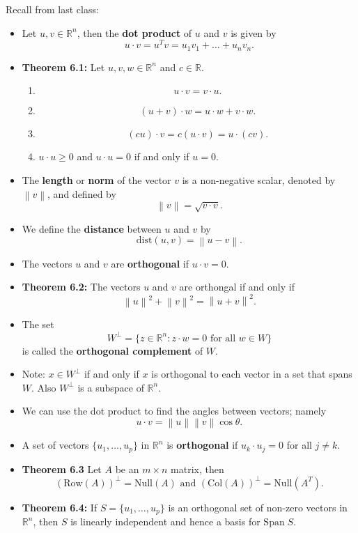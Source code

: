 \documentclass[12pt,letterpaper]{article}
\newcommand{\norm}[1]{\left\lVert#1\right\rVert}
\begin{document}
\thispagestyle{fancy}

Recall from last class:

\begin{itemize}
\item Let $u, v \in \mathbb{R}^n$, then the {\bf dot product} of $u$ and $v$ is given by $$u \cdot v= u^{T}v=u_1 v_1+\dots+ u_n v_n.$$
\item {\bf Theorem 6.1:} Let $u, v, w \in \mathbb{R}^n$ and $c\in \mathbb{R}$.
\begin{enumerate}
	\item $$ u \cdot v = v \cdot u.$$
	\item $$(u+v)\cdot w= u \cdot w+ v \cdot w.$$
	\item $$(cu)\cdot v = c(u\cdot v)= u \cdot (cv).$$
	\item $u \cdot u \geq 0$ and $u \cdot u =0$ if and only if $u=0$.
\end{enumerate}
\item  The {\bf length} or {\bf norm} of the vector $v$ is a non-negative scalar, denoted by $\norm{v}$, and defined by $$\norm{v}= \sqrt{v\cdot v}.$$
\item We define the {\bf distance} between $u$ and $v$ by $$\text{dist}(u,v)=\norm{u-v}.$$
\item The vectors $u$ and $v$ are {\bf orthogonal} if $u\cdot v=0$.
\item {\bf Theorem 6.2:} The vectors $u$ and $v$ are orthongal if and only if $$\norm{u}^2+\norm{v}^2=\norm{u+v}^2.$$
\item The set $$W^{\perp} =\{ z \in \mathbb{R}^n: z \cdot w=0 \text{ for all } w \in W\}$$ is called the {\bf orthogonal complement} of $W$.
\item Note: $x \in W^{\perp}$ if and only if $x$ is orthogonal to each vector in a set that spans $W$. Also $W^{\perp}$ is a subspace of $\mathbb{R}^n$.
\item We can use the dot product to find the angles between vectors; namely $$u\cdot v = \norm{u} \norm{v} \cos \theta.$$
\item 	A set of vectors $\{ u_1, \dots, u_p\}$ in $\mathbb{R}^n$ is {\bf orthogonal} if $u_k \cdot u_j=0$ for all $j\neq k$.
\item {\bf Theorem 6.3} Let $A$ be an $m\times n$ matrix, then $$(\text{Row}(A))^{\perp} = \text{Null}(A) \text{ and } (\text{Col}(A))^{\perp}= \text{Null}(A^{T}).$$
\item
{\bf Theorem 6.4:} If $S=\{ u_1, \dots, u_p\}$ is an orthogonal set of non-zero vectors in $\mathbb{R}^n$, then $S$ is linearly independent and hence a basis for $\text{Span} \; S$.
\end{itemize}
\end{document}
